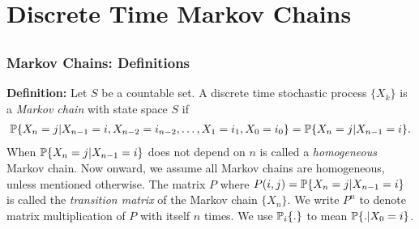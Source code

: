 \documentclass[all-lectures.tex]{subfiles}
\begin{document}

\chapter{Discrete Time Markov Chains}
\setcounter{section}{1}
\setcounter{subsection}{0}

\section*{}
\subsection{Markov Chains: Definitions}
\textbf{Definition:}
Let $S$ be a countable set. A discrete time stochastic process  $\{X_k\}$ is a \textit{Markov chain} with state space $S$ if 
\begin{align*}
\P\{X_n = j|X_{n-1} = i, X_{n-2} = i_{n-2},\dots,X_1 = i_1,X_0 = i_0\} = \P\{X_n = j|X_{n-1} = i\}.
\end{align*}
When $\P\{X_n = j|X_{n-1} = i\}$ does not depend on $n$ is called a \textit{homogeneous }Markov chain. Now onward, we assume all Markov chains are homogeneous, unless mentioned otherwise. The matrix $P$ where $P(i,j) = \P\{X_n = j|X_{n-1} = i\}$ is called the \textit{transition matrix }of the Markov chain $\{X_n\}$. We write $P^n$ to denote matrix multiplication of $P$ with itself $n$ times. We use $\P_i\{.\}$ to mean $\P\{.|X_0 = i\}$. \\
\end{document}
